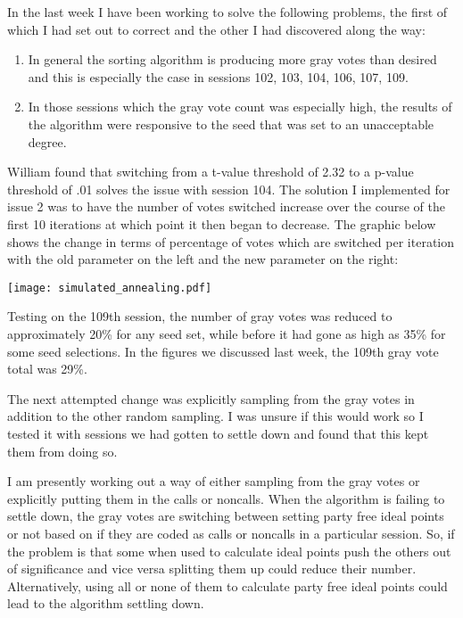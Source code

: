 \documentclass[12pt]{article}
\begin{document}
In the last week I have been working to solve the following problems, the first of which I had set out to correct and the other I had discovered along the way:

\begin{enumerate}
	\item In general the sorting algorithm is producing more gray votes than desired and this is especially the case in sessions 102, 103, 104, 106, 107, 109.
	
	\item In those sessions which the gray vote count was especially high, the results of the algorithm were responsive to the seed that was set to an unacceptable degree.
\end{enumerate}

William found that switching from a t-value threshold of 2.32 to a p-value threshold of .01 solves the issue with session 104. The solution I implemented for issue 2 was to have the number of votes switched increase over the course of the first 10 iterations at which point it then began to decrease. The graphic below shows the change in terms of percentage of votes which are switched per iteration with the old parameter on the left and the new parameter on the right:

\texttt{[image: simulated\_annealing.pdf]}

\noindent
Testing on the 109th session, the number of gray votes was reduced to approximately 20\% for any seed set, while before it had gone as high as 35\% for some seed selections. In the figures we discussed last week, the 109th gray vote total was 29\%.

The next attempted change was explicitly sampling from the gray votes in addition to the other random sampling. I was unsure if this would work so I tested it with sessions we had gotten to settle down and found that this kept them from doing so. 

I am presently working out a way of either sampling from the gray votes or explicitly putting them in the calls or noncalls. When the algorithm is failing to settle down, the gray votes are switching between setting party free ideal points or not based on if they are coded as calls or noncalls in a particular session. So, if the problem is that some when used to calculate ideal points push the others out of significance and vice versa splitting them up could reduce their number. Alternatively, using all or none of them to calculate party free ideal points could lead to the algorithm settling down.




	
\end{document}
